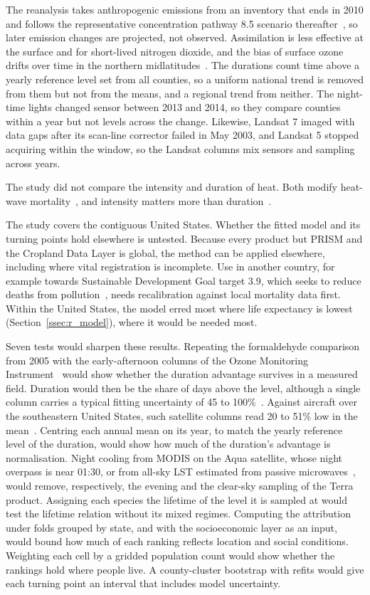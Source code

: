 \documentclass[sensors,article,submit,moreauthors,pdftex]{Definitions/mdpi}
\begin{document}
The
reanalysis takes anthropogenic emissions from an inventory that ends in 2010
and follows the representative concentration pathway 8.5 scenario
thereafter~\cite{Inness2019}, so later emission changes are projected, not
observed. Assimilation is less effective at the surface and for short-lived
nitrogen dioxide, and the bias of surface ozone drifts over time in the
northern midlatitudes~\cite{Wagner2021}. The durations count time above a yearly reference level set from all counties, so a
uniform national trend is removed from them but not from the means, and a
regional trend from neither. The
night-time lights changed sensor between 2013 and 2014, so they compare
counties within a year but not levels across the change. Likewise, Landsat 7 imaged with data gaps after its scan-line
corrector failed in May 2003, and Landsat 5 stopped acquiring within the
window, so the Landsat columns mix sensors and sampling across years.

The study did not compare the intensity and duration of heat. Both modify heat-wave
mortality~\cite{Anderson2010}, and intensity matters more than
duration~\cite{Xu2016}.

The study covers the contiguous United States.
Whether the fitted model and its turning points hold elsewhere is untested.
Because every product but PRISM and the Cropland Data Layer is global, the
method can be applied elsewhere, including where vital registration is
incomplete. Use in another country, for example towards Sustainable
Development Goal target 3.9, which seeks to reduce deaths from
pollution~\cite{UN2015}, needs recalibration against local mortality data
first.
Within the United States, the model erred most where life expectancy is lowest
(Section~\ref{ssec:r_model}), where it would be needed most.

Seven tests would sharpen these results. Repeating the formaldehyde comparison
from 2005 with the early-afternoon columns of the Ozone Monitoring
Instrument~\cite{GonzalezAbad2015} would show whether the duration
advantage survives in a measured field. Duration would then be the share of
days above the level, although a single column carries a typical fitting
uncertainty of 45 to 100\%~\cite{GonzalezAbad2015}. Against aircraft over the
southeastern United States, such satellite columns read 20 to 51\% low in the
mean~\cite{Zhu2016}. Centring each annual mean on its
year, to match the yearly reference level of the duration, would show how much
of the duration's advantage is normalisation. Night cooling from MODIS on the Aqua satellite, whose
night overpass is near 01:30, or from all-sky LST estimated from passive
microwaves~\cite{Ermida2019}, would remove, respectively, the evening and
the clear-sky sampling of the Terra product. Assigning each species the lifetime of the level it is
sampled at would test the lifetime relation without its mixed regimes.
Computing the attribution under folds grouped by state, and with the
socioeconomic layer as an input, would bound how much of each ranking
reflects location and social conditions. Weighting each cell by a gridded
population count would show whether the rankings hold where people live. A
county-cluster bootstrap with
refits would give each turning point an interval that includes model
uncertainty.
\end{document}
